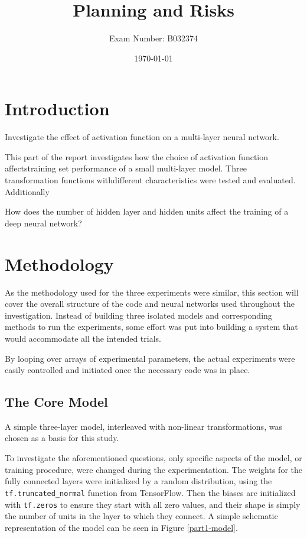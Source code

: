 \documentclass[]{article}
\title{Planning and Risks}
\author{Exam Number: B032374}
\date{\today}
\begin{document}
\maketitle

\section{Introduction}


Investigate the effect of activation function on a multi-layer neural network.

This part of the report investigates how the choice of activation function affectstraining set performance of a small multi-layer model. Three transformation functions withdifferent characteristics were tested and evaluated.
Additionally

How does the number of hidden layer and hidden units affect the training of a deep neural network?



\section{Methodology}

As the methodology used for the three experiments were similar, this section will cover the overall structure of the code and neural networks used throughout the investigation. Instead of building three isolated models and corresponding methods to run the experiments, some effort was put into building a system that would accommodate all the intended trials. 

By looping over arrays of experimental parameters, the actual experiments were easily controlled and initiated once the necessary code was in place. 

\subsection{The Core Model}

A simple three-layer model, interleaved with non-linear transformations, was chosen as a basis for this study. 

To investigate the aforementioned questions, only specific aspects of the model, or training procedure, were changed during the experimentation. The weights for the fully connected layers were initialized by a random distribution, using the \texttt{tf.truncated\_normal} function from TensorFlow. Then the biases are initialized with \texttt{tf.zeros} to ensure they start with all zero values, and their shape is simply the number of units in the layer to which they connect. A simple schematic representation of the model can be seen in Figure \ref{part1-model}.
\end{document}
